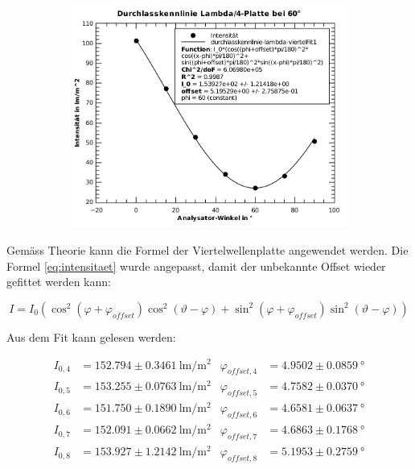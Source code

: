 \begin{figure}[H]
\begin{subfigure}{.45\linewidth}
        \includegraphics[width=\linewidth]{images/aufgabe-5_60grad.pdf}
    \end{subfigure}
    \caption{}
\end{figure}
Gem\"ass Theorie  kann die Formel der Viertelwellenplatte angewendet werden. Die
Formel \ref{eq:intensitaet} wurde angepasst, damit der unbekannte Offset  wieder
gefittet werden kann:

\begin{equation}
    I = I_0\left(\cos^2(\varphi+\varphi_{offset})\cos^2(\vartheta-\varphi) + \sin^2(\varphi+\varphi_{offset})\sin^2(\vartheta-\varphi)\right)
\end{equation}

Aus dem Fit kann gelesen werden:

\begin{align*}
    I_{0,4} &= 152.794 \pm 0.3461\SI{}{\lumen\per\square\meter} & \varphi_{offset,4} &= 4.9502 \pm 0.0859\SI{}{\degree} \\
    I_{0,5} &= 153.255 \pm 0.0763\SI{}{\lumen\per\square\meter} & \varphi_{offset,5} &= 4.7582 \pm 0.0370\SI{}{\degree} \\
    I_{0,6} &= 151.750 \pm 0.1890\SI{}{\lumen\per\square\meter} & \varphi_{offset,6} &= 4.6581 \pm 0.0637\SI{}{\degree} \\
    I_{0,7} &= 152.091 \pm 0.0662\SI{}{\lumen\per\square\meter} & \varphi_{offset,7} &= 4.6863 \pm 0.1768\SI{}{\degree} \\
    I_{0,8} &= 153.927 \pm 1.2142\SI{}{\lumen\per\square\meter} & \varphi_{offset,8} &= 5.1953 \pm 0.2759\SI{}{\degree} \\
\end{align*}


